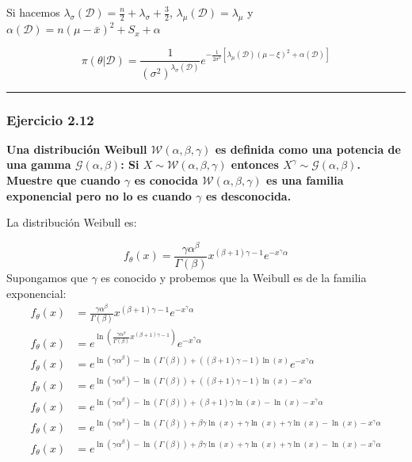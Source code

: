\documentclass[12pt,]{article}
\begin{document}
Si hacemos
\(\lambda_\sigma(\mathcal{D})=\frac{n}{2}+\lambda_\sigma+\frac{3}{2}\),
\(\lambda_\mu(\mathcal{D})=\lambda_\mu\) y
\(\alpha(\mathcal{D})=n(\mu-\bar x)^2 + S_x+\alpha\)

\[\pi(\theta|\mathcal{D}) = \frac{1}{(\sigma^2)^{\lambda_\sigma(\mathcal{D})}} e^{-\frac{1}{2\sigma^2}[\lambda_\mu(\mathcal{D})(\mu-\xi)^2+\alpha(\mathcal{D})]}\]

\begin{center}\rule{0.5\linewidth}{\linethickness}\end{center}

\subsubsection{Ejercicio 2.12}\label{ejercicio-2.12}

\textbf{Una distribución Weibull \(\mathcal{W}(\alpha, \beta,\gamma)\)
es definida como una potencia de una gamma
\(\mathcal{G}(\alpha, \beta)\): Si
\(X\sim\mathcal{W}(\alpha, \beta,\gamma)\) entonces
\(X^\gamma\sim\mathcal{G}(\alpha, \beta)\). Muestre que cuando
\(\gamma\) es conocida \(\mathcal{W}(\alpha, \beta,\gamma)\) es una
familia exponencial pero no lo es cuando \(\gamma\) es desconocida.}

La distribución Weibull es:

\[f_\theta(x)=\frac{\gamma \alpha^\beta}{\Gamma(\beta)}x^{(\beta+1)\gamma -1}e^{-x^\gamma\alpha}\]
Supongamos que \(\gamma\) es conocido y probemos que la Weibull es de la
familia exponencial: \[
\begin{array}{rl}
f_\theta(x) & = \frac{\gamma \alpha^\beta}{\Gamma(\beta)}x^{(\beta+1)\gamma -1}e^{-x^\gamma\alpha}\\
f_\theta(x) & = e^{\ln(\frac{\gamma \alpha^\beta}{\Gamma(\beta)}x^{(\beta+1)\gamma -1})}e^{-x^\gamma\alpha}\\
f_\theta(x) & = e^{\ln(\gamma \alpha^\beta) -\ln(\Gamma(\beta))+((\beta+1)\gamma -1)\ln(x)}e^{-x^\gamma\alpha}\\
f_\theta(x) & = e^{\ln(\gamma \alpha^\beta) -\ln(\Gamma(\beta))+((\beta+1)\gamma -1)\ln(x)-x^\gamma\alpha}\\
f_\theta(x) & = e^{\ln(\gamma \alpha^\beta) -\ln(\Gamma(\beta))+(\beta+1)\gamma\ln(x)-\ln(x)-x^\gamma\alpha}\\
f_\theta(x) & = e^{\ln(\gamma \alpha^\beta) -\ln(\Gamma(\beta))+\beta\gamma\ln(x)+\gamma\ln(x)+\gamma\ln(x)-\ln(x)-x^\gamma\alpha}\\
f_\theta(x) & = e^{\ln(\gamma \alpha^\beta) -\ln(\Gamma(\beta))+\beta\gamma\ln(x)+\gamma\ln(x)+\gamma\ln(x)-\ln(x)-x^\gamma\alpha}\\
\end{array}
\]
\end{document}
